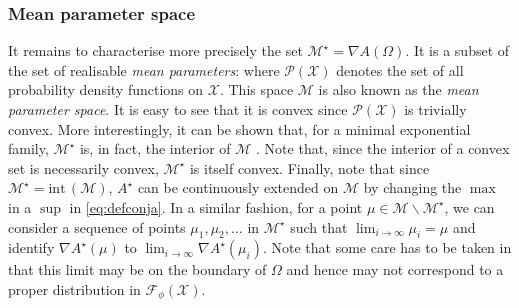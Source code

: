 \subsubsection*{Mean parameter space}
It remains to characterise more precisely the set $\mathcal M^{\star}=\nabla A(\Omega)$. It is a subset of the set of realisable \emph{mean parameters}:
%
%
where $\mathcal P(\mathcal X)$ denotes the set of all probability density functions on $\mathcal X$. This space $\mathcal M$ is also known as the \emph{mean parameter space}. It is easy to see that it is convex since $\mathcal P(\mathcal X)$ is trivially convex. More interestingly, it can be shown that, for a minimal exponential family, $\mathcal M^{\star}$ is, in fact, the interior of $\mathcal M$ \citep[theorem 3.3]{wainwright08}. Note that, since the interior of a convex set is necessarily convex, $\mathcal M^{\star}$ is itself convex. Finally, note that since $\mathcal M^{\star}=\mathrm{int}\,(\mathcal M)$, $A^{\star}$ can be continuously extended on $\mathcal M$ by changing the $\max$ in a $\sup$ in \eqref{eq:defconja}. In a similar fashion, for a point $\mu\in\mathcal M\backslash \mathcal M^{\star}$, we can consider a sequence of points $\mu_{1},\mu_{2},\dots$ in $\mathcal M^{\star}$ such that $\lim_{i\to\infty}\mu_{i}=\mu$ and identify $\nabla A^{\star}(\mu)$ to $\lim_{i\to\infty}\nabla A^{\star}(\mu_{i})$. Note that some care has to be taken in that this limit may be on the boundary of $\Omega$ and hence may not correspond to a proper distribution in $\mathcal F_{\phi}(\mathcal X)$.  

